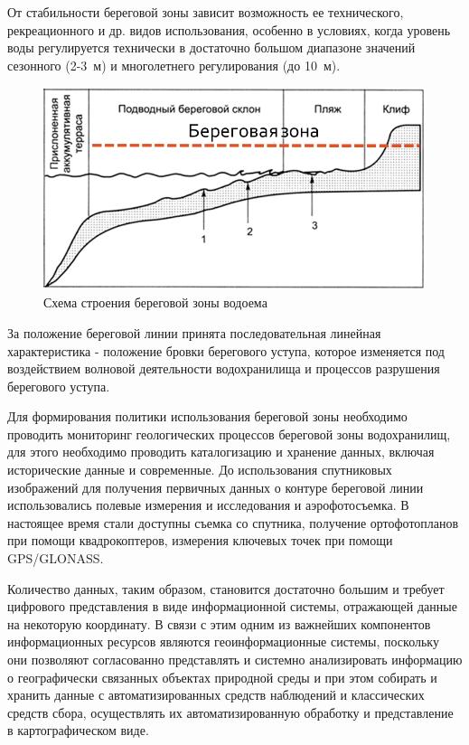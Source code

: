 \documentclass[732,14pt,final]{studrep}
\begin{document}
От стабильности береговой зоны зависит возможность ее технического, рекреационного и др. видов использования, особенно в условиях, когда уровень воды регулируется технически в достаточно большом диапазоне значений сезонного (2-3~м) и многолетнего регулирования (до 10~м).

  \begin{figure}[htp]
	\centering
    \includegraphics[width=\linewidth]{pics/image1.png}
    \caption{Схема строения береговой зоны водоема}
    \label{fig:shore-schema}
  \end{figure}

За положение береговой линии принята последовательная линейная характеристика - положение бровки берегового уступа, которое изменяется под воздействием волновой деятельности водохранилища и процессов разрушения берегового уступа.

Для формирования политики использования береговой зоны необходимо проводить мониторинг геологических процессов береговой зоны водохранилищ, для этого необходимо проводить каталогизацию и хранение данных, включая исторические данные и современные. До использования спутниковых изображений для получения первичных данных о контуре береговой линии использовались полевые измерения и исследования и аэрофотосъемка. В настоящее время стали доступны съемка со спутника, получение ортофотопланов при помощи квадрокоптеров, измерения ключевых точек при помощи GPS/GLONASS.

Количество данных, таким образом, становится достаточно большим и требует цифрового представления в виде информационной системы, отражающей данные на некоторую координату. В связи с этим одним из важнейших компонентов информационных ресурсов являются геоинформационные системы, поскольку они позволяют согласованно представлять и системно анализировать информацию о географически связанных объектах природной среды и при этом собирать и хранить данные с автоматизированных средств наблюдений и классических средств сбора, осуществлять их автоматизированную обработку и представление в картографическом виде.
\end{document}
